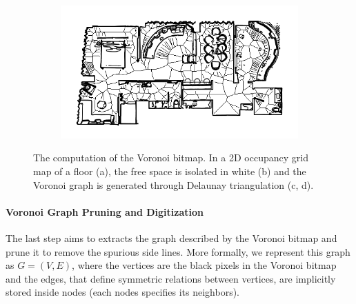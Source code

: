 \begin{figure}[h!]
\begin{subfigure}[b]{0.49\linewidth}
		\caption{}
		\label{fig:pose_estimator_voronoi_bitmap}
	\end{subfigure}
	\hfil
	\begin{subfigure}[b]{0.49\linewidth}
		\centering
		\includegraphics[width=\textwidth]{images/pose_estimator_bitmap_map.png}
		\caption{}
		\label{fig:pose_estimator_voronoi_bitmap_map}
	\end{subfigure}
	\caption{The computation of the Voronoi bitmap. In a 2D occupancy grid map of a floor (a), the free space is isolated in white (b) and the Voronoi graph is generated through Delaunay triangulation (c, d).}
	\label{fig:pose_estimator}
\end{figure}

\paragraph{Voronoi Graph Pruning and Digitization} The last step aims to extracts the graph described by the Voronoi bitmap and prune it to remove the spurious side lines. More formally, we represent this graph as $G = (V, E)$, where the vertices are the black pixels in the Voronoi bitmap and the edges, that define symmetric relations between vertices, are implicitly stored inside nodes (each nodes specifies its neighbors). 

